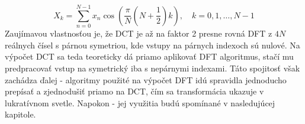 \begin{equation}
    X_k = \sum_{n=0}^{N-1} x_n \cos (\frac{\pi}{N} (N + \frac{1}{2}) k),
    \quad k=0,1,\dots,N-1
    \label{eq:dct_transform}
\end{equation}
Zaujímavou vlastnosťou je, že DCT je až na faktor 2 presne rovná DFT z
$4N$ reálnych čísel s párnou symetriou, kde vstupy na párnych indexoch
sú nulové. Na výpočet DCT sa teda teoreticky dá priamo aplikovať DFT
algoritmus, stačí mu predpracovať vstup na symetrický iba s nepárnymi
indexami. Táto spojitosť však zachádza ďalej - algoritmy použité na
výpočet DFT idú spravidla jednoducho prepísať a zjednodušiť priamo na
DCT, čím sa transformácia ukazuje v lukratívnom svetle. Napokon - jej
využitia budú spomínané v nasledujúcej kapitole.
